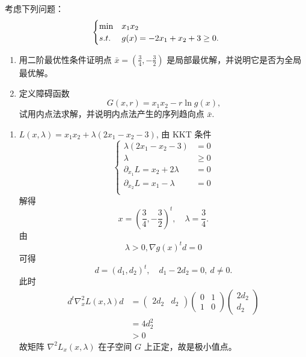 \begin{example}
    考虑下列问题：
    \[
        \begin{cases}
            \min &x_1x_2\\
            s.t. &g(x) = -2x_1 + x_2 + 3 \ge 0.
        \end{cases}
    \]
    \begin{enumerate}
        \item 用二阶最优性条件证明点 $\bar{x} = \left(\frac{3}{4}, -\frac{3}{2}\right)$ 是局部最优解，并说明它是否为全局最优解。
        \item 定义障碍函数 
        \[
            G(x, r) = x_1x_2 - r\ln g(x)\text{,}
        \]
        试用内点法求解，并说明内点法产生的序列趋向点 $\bar{x}$.
    \end{enumerate}

    \answer \text{}
    \begin{enumerate}
        \item $L(x, \lambda) = x_1x_2 + \lambda(2x_1 - x_2 - 3)$, 由 KKT 条件
        \[
            \begin{cases}
                \lambda(2x_1 - x_2 - 3) &= 0\\
                \lambda &\ge 0\\
                \partial_{x_1}L = x_2 + 2\lambda &= 0\\
                \partial_{x_2}L = x_1 - \lambda &= 0\\
            \end{cases}
        \]
        解得 
        \[
            x = \left(\frac{3}{4}, -\frac{3}{2}\right)^t, \quad \lambda = \dfrac{3}{4}.
        \]
        由 \[\lambda > 0, \nabla g(x)^td = 0\]
        可得 
        \[d = (d_1, d_2)^t, \quad  d_1 - 2d_2 = 0,\ d \neq 0.\] 
        此时 
        \begin{align*}
            d^t\nabla^2_xL(x, \lambda)d &= \begin{pmatrix}
                2d_2 & d_2
            \end{pmatrix} \begin{pmatrix}
                0 & 1 \\ 1 & 0
            \end{pmatrix} \begin{pmatrix}
                2d_2 \\ d_2
            \end{pmatrix}\\
            &=4d_2^2\\
            &> 0
        \end{align*} 
        故矩阵 $\nabla^2L_x(x, \lambda)$ 在子空间 $G$ 上正定，故是极小值点。


\end{enumerate}
\end{example}
